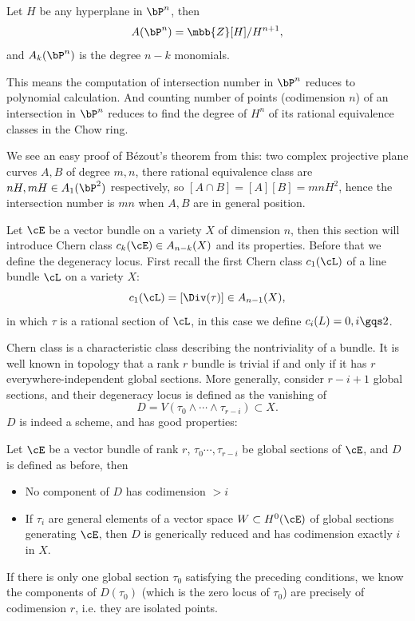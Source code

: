 \documentclass[a4paper, twoside]{article}
\begin{document}
\begin{exg}
	Let $H$ be any hyperplane in $\bP^n$, then
	$$
	A(\bP^n) = \mbb{Z}[H]/H^{n+1},
	$$
	and $A_k(\bP^n)$ is the degree $n-k$ monomials.
\end{exg}
This means the computation of intersection number in $\bP^n$ reduces to polynomial calculation. And counting number of points (codimension $n$) of an intersection in $\bP^n$ reduces to find the degree of $H^n$ of its rational equivalence classes in the Chow ring.

We see an easy proof of B\'ezout's theorem from this: two complex projective plane curves $A,B$ of degree $m,n$, there rational equivalence class are $nH,mH\in A_1(\bP^2)$ respectively, so $[A\cap B]=[A][B]=mn H^2$, hence the intersection number is $mn$ when $A,B$ are in general position.

Let $\cE$ be a vector bundle on a variety $X$ of dimension $n$, then this section will introduce Chern class $c_k(\cE)\in A_{n-k}(X)$ and its properties. Before that we define the degeneracy locus. First recall the first Chern class $c_1(\cL)$ of a line bundle $\cL$ on a variety $X$:
$$
c_1(\cL)=[\Div(\tau)]\in A_{n-1}(X),
$$
in which $\tau$ is a rational section of $\cL$, in this case we define $c_i(L)=0, i\gqs 2$.

Chern class is a characteristic class describing the nontriviality of a bundle. It is well known in topology that a rank $r$ bundle is trivial if and only if it has $r$ everywhere-independent global sections. More generally, consider $r-i+1$ global sections, and their degeneracy locus is defined as the vanishing of
$$
D=V(\tau_0\wedge\cdots\wedge\tau_{r-i})\subset X.
$$
$D$ is indeed a scheme, and has good properties:
\begin{lem}
	Let $\cE$ be a vector bundle of rank $r$, $\tau_0\cdots,\tau_{r-i}$ be global sections of $\cE$, and $D$ is defined as before, then
	\begin{itemize}
		\item No component of $D$ has codimension $>i$
		\item If $\tau_i$ are general elements of a vector space $W\subset H^0(\cE)$ of global sections generating $\cE$, then $D$ is generically reduced and has codimension exactly $i$ in $X$.
	\end{itemize}
\end{lem}

\begin{cor}\label{locus}
If there is only one global section $\tau_0$ satisfying the preceding conditions, we know the components of $D(\tau_0)$ (which is the zero locus of $\tau_0$) are precisely of codimension $r$, i.e. they are isolated points.
\end{cor}
\end{document}
